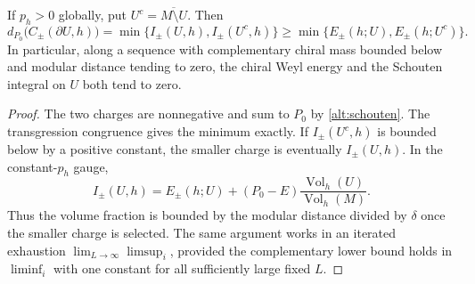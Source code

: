 \begin{proposition}
\label{alt:positive-charge}
If \(p_h>0\) globally, put \(U^c=\overline{M\setminus U}\).
Then
\[
 d_{P_0}\bigl(C_\pm(\partial U,h)\bigr)
 =\min\{I_\pm(U,h),I_\pm(U^c,h)\}
 \ge\min\{E_\pm(h;U),E_\pm(h;U^c)\}.
\]
In particular, along a sequence with complementary chiral mass
bounded below and modular distance tending to zero, the chiral
Weyl energy and the Schouten integral on \(U\) both tend to zero.
\end{proposition}

\begin{proof}
The two charges are nonnegative and sum to \(P_0\) by
\eqref{alt:schouten}. The transgression congruence gives the
minimum exactly. If \(I_\pm(U^c,h)\) is bounded below by a positive
constant, the smaller charge is eventually \(I_\pm(U,h)\).
In the constant-\(p_h\) gauge,
\[
 I_\pm(U,h)=E_\pm(h;U)+(P_0-E)
                \frac{\operatorname{Vol}_h(U)}{\operatorname{Vol}_h(M)}.
\]
Thus the volume fraction is bounded by the modular distance divided
by \(\delta\) once the smaller charge is selected.
The same argument works in an iterated exhaustion
\(\lim_{L\to\infty}\limsup_i\), provided the complementary lower
bound holds in \(\liminf_i\) with one constant for all sufficiently
large fixed \(L\).
\end{proof}

